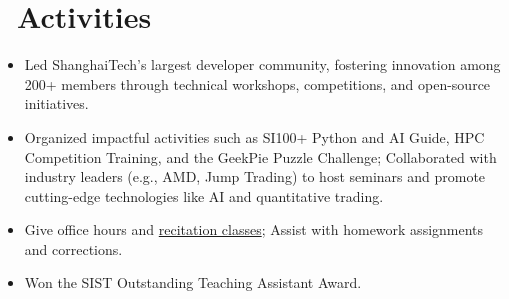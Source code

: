 \documentclass{resume}
\begin{document}



\section{\faInfo\ Activities}


\begin{itemize}
  \item Led ShanghaiTech’s largest developer community, fostering innovation among 200+ members through technical workshops, competitions, and open-source initiatives.
  \item Organized impactful activities such as SI100+ Python and AI Guide, HPC Competition Training, and the GeekPie Puzzle Challenge; Collaborated with industry leaders (e.g., AMD, Jump Trading) to host seminars and promote cutting-edge technologies like AI and quantitative trading.
\end{itemize}


\begin{itemize}
  \item Give office hours and \href{https://github.com/GKxxQAQ/CS100-recitations-spring2023}{recitation classes}; Assist with homework assignments and corrections.
  \item Won the SIST Outstanding Teaching Assistant Award.
\end{itemize}
\end{document}
